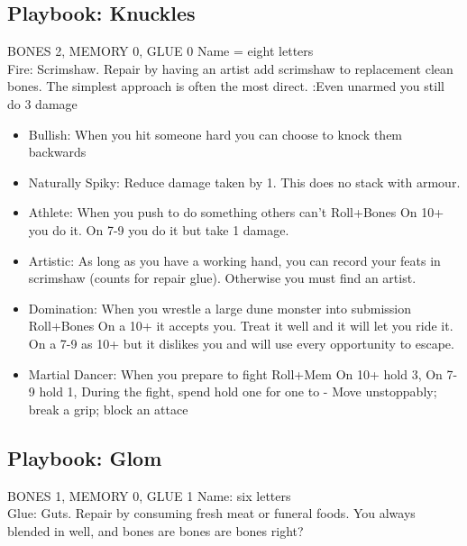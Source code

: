 \subsection{Playbook: Knuckles}
BONES 2, MEMORY 0, GLUE 0  
Name = eight letters
\\Fire: Scrimshaw. Repair by having an artist add scrimshaw to replacement clean bones.
The simplest approach is often the most direct.
:Even unarmed you still do 3 damage
\begin{itemize}
\item  Bullish: When you hit someone hard you can choose to knock them backwards
\item  Naturally Spiky: Reduce damage taken by 1. This does no stack with armour.
\item  Athlete: When you push to do something others can't Roll+Bones
\myitem On 10+ you do it.
\myitemend On 7-9 you do it but take 1 damage.
\item  Artistic: As long as you have a working hand, you can record your feats in scrimshaw (counts for repair glue). Otherwise you must find an artist.
\item  Domination: When you wrestle a large dune monster into submission Roll+Bones 
\myitem On a 10+ it accepts you. Treat it well and it will let you ride it.
\myitemend On a 7-9 as 10+ but it dislikes you and will use every opportunity to escape.
\item  Martial Dancer: When you prepare to fight Roll+Mem
\myitem On 10+ hold 3,
\myitem On 7-9 hold 1,
\myitemend During the fight, spend hold one for one to - Move unstoppably; break a grip; block an attace\end{itemize}


\newpage
\subsection{Playbook: Glom}
BONES 1, MEMORY 0, GLUE 1  
Name: six letters
\\ Glue: Guts. Repair by consuming fresh meat or funeral foods.
You always blended in well, and bones are bones are bones right?

